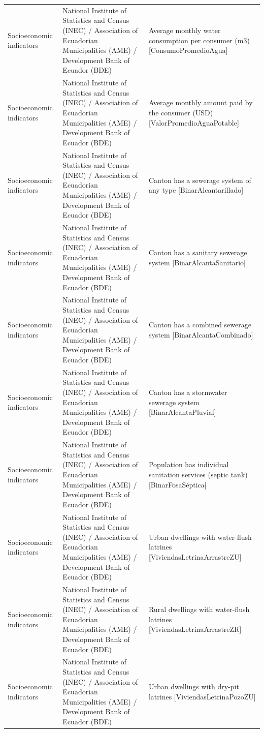 \begin{landscape}
\begin{longtable}[t]{>{\raggedright\arraybackslash}p{3.4cm}>{\raggedright\arraybackslash}p{5.6cm}>{\raggedright\arraybackslash}p{12.4cm}}
Socioeconomic indicators & National Institute of Statistics and Census (INEC) / Association of Ecuadorian Municipalities (AME) / Development Bank of Ecuador (BDE) & Average monthly water consumption per consumer (m3) [ConsumoPromedioAgua]\\
Socioeconomic indicators & National Institute of Statistics and Census (INEC) / Association of Ecuadorian Municipalities (AME) / Development Bank of Ecuador (BDE) & Average monthly amount paid by the consumer (USD) [ValorPromedioAguaPotab\allowbreak{}le]\\
Socioeconomic indicators & National Institute of Statistics and Census (INEC) / Association of Ecuadorian Municipalities (AME) / Development Bank of Ecuador (BDE) & Canton has a sewerage system of any type [BinarAlcantarillado]\\
Socioeconomic indicators & National Institute of Statistics and Census (INEC) / Association of Ecuadorian Municipalities (AME) / Development Bank of Ecuador (BDE) & Canton has a sanitary sewerage system [BinarAlcantaSanitario]\\
Socioeconomic indicators & National Institute of Statistics and Census (INEC) / Association of Ecuadorian Municipalities (AME) / Development Bank of Ecuador (BDE) & Canton has a combined sewerage system [BinarAlcantaCombinado]\\
Socioeconomic indicators & National Institute of Statistics and Census (INEC) / Association of Ecuadorian Municipalities (AME) / Development Bank of Ecuador (BDE) & Canton has a stormwater sewerage system [BinarAlcantaPluvial]\\
Socioeconomic indicators & National Institute of Statistics and Census (INEC) / Association of Ecuadorian Municipalities (AME) / Development Bank of Ecuador (BDE) & Population has individual sanitation services (septic tank) [BinarFosaSéptica]\\
Socioeconomic indicators & National Institute of Statistics and Census (INEC) / Association of Ecuadorian Municipalities (AME) / Development Bank of Ecuador (BDE) & Urban dwellings with water-flush latrines [ViviendasLetrinaArrast\allowbreak{}reZU]\\
Socioeconomic indicators & National Institute of Statistics and Census (INEC) / Association of Ecuadorian Municipalities (AME) / Development Bank of Ecuador (BDE) & Rural dwellings with water-flush latrines [ViviendasLetrinaArrast\allowbreak{}reZR]\\
Socioeconomic indicators & National Institute of Statistics and Census (INEC) / Association of Ecuadorian Municipalities (AME) / Development Bank of Ecuador (BDE) & Urban dwellings with dry-pit latrines [ViviendasLetrinaPozoZU]\\

\end{longtable}
\end{landscape}
